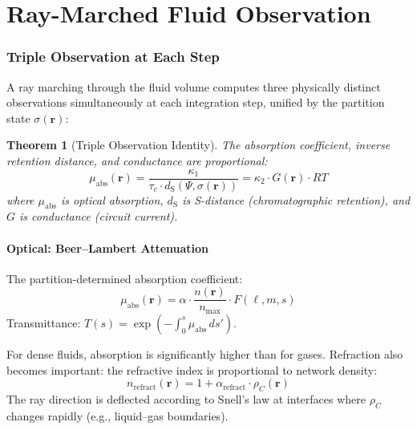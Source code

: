 \documentclass[twocolumn,10pt,a4paper]{article}
\theoremstyle{plain}
\newtheorem{theorem}{Theorem}[section]
\theoremstyle{definition}
\theoremstyle{remark}
\newcommand{\tauc}{\tau_c}
\newcommand{\dS}{d_{\mathrm{S}}}
\begin{document}

\part{Ray-Marched Fluid Observation}
\label{part:ray_march}

\section{Triple Observation at Each Step}
\label{sec:triple_obs}

A ray marching through the fluid volume computes three physically distinct observations simultaneously at each integration step, unified by the partition state $\sigma(\mathbf{r})$:

\begin{theorem}[Triple Observation Identity]
\label{thm:triple_obs}
The absorption coefficient, inverse retention distance, and conductance are proportional:
\begin{equation}
\boxed{\mu_{\mathrm{abs}}(\mathbf{r}) = \frac{\kappa_1}{\tauc \cdot \dS(\Psi, \sigma(\mathbf{r}))} = \kappa_2 \cdot G(\mathbf{r}) \cdot RT}
\end{equation}
where $\mu_{\mathrm{abs}}$ is optical absorption, $\dS$ is S-distance (chromatographic retention), and $G$ is conductance (circuit current).
\end{theorem}

\subsection{Optical: Beer--Lambert Attenuation}

The partition-determined absorption coefficient:
\begin{equation}
    \mu_{\mathrm{abs}}(\mathbf{r}) = \alpha \cdot \frac{n(\mathbf{r})}{n_{\max}} \cdot F(\ell, m, s)
\end{equation}
Transmittance: $T(s) = \exp(-\int_0^s \mu_{\mathrm{abs}}\, ds')$.

For dense fluids, absorption is significantly higher than for gases. Refraction also becomes important: the refractive index is proportional to network density:
\begin{equation}
    n_{\mathrm{refract}}(\mathbf{r}) = 1 + \alpha_{\mathrm{refract}} \cdot \rho_C(\mathbf{r})
\end{equation}
The ray direction is deflected according to Snell's law at interfaces where $\rho_C$ changes rapidly (e.g., liquid--gas boundaries).
\end{document}
